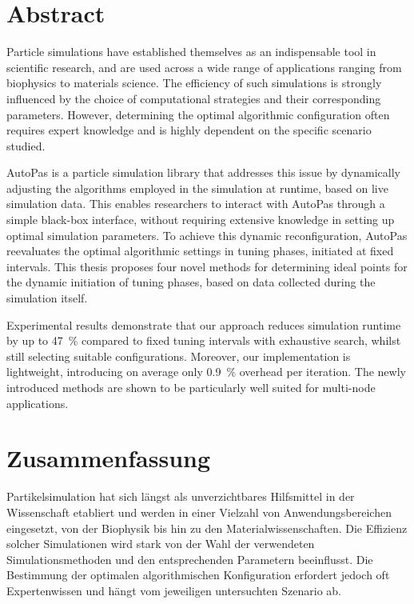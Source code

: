 \thispagestyle{plain}

\chapter*{Abstract}

Particle simulations have established themselves as an indispensable tool in scientific research, and are used across a wide range of applications ranging from biophysics to materials science. The efficiency of such simulations is strongly influenced by the choice of computational strategies and their corresponding parameters. However, determining the optimal algorithmic configuration often requires expert knowledge and is highly dependent on the specific scenario studied.

AutoPas is a particle simulation library that addresses this issue by dynamically adjusting the algorithms employed in the simulation at runtime, based on live simulation data. This enables researchers to interact with AutoPas through a simple black-box interface, without requiring extensive knowledge in setting up optimal simulation parameters. To achieve this dynamic reconfiguration, AutoPas reevaluates the optimal algorithmic settings in tuning phases, initiated at fixed intervals. This thesis proposes four novel methods for determining ideal points for the dynamic initiation of tuning phases, based on data collected during the simulation itself.

Experimental results demonstrate that our approach reduces simulation runtime by up to \qty{47}{\percent} compared to fixed tuning intervals with exhaustive search, whilst still selecting suitable configurations. Moreover, our implementation is lightweight, introducing on average only \qty{0.9}{\percent} overhead per iteration. The newly introduced methods are shown to be particularly well suited for multi-node applications.


\MediaOptionLogicBlank

\chapter*{Zusammenfassung}

Partikelsimulation hat sich längst als unverzichtbares Hilfsmittel in der Wissenschaft etabliert und werden in einer Vielzahl von Anwendungsbereichen eingesetzt, von der Biophysik bis hin zu den Materialwissenschaften. Die Effizienz solcher Simulationen wird stark von der Wahl der verwendeten Simulationsmethoden und den entsprechenden Parametern beeinflusst. Die Bestimmung der optimalen algorithmischen Konfiguration erfordert jedoch oft Expertenwissen und hängt vom jeweiligen untersuchten Szenario ab.

